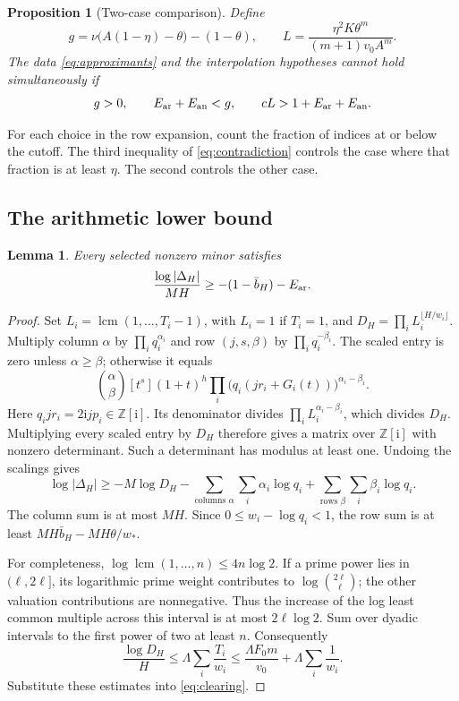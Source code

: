 \documentclass[11pt]{article}
\newtheorem{proposition}[theorem]{Proposition}
\newtheorem{lemma}[theorem]{Lemma}
\theoremstyle{definition}
\theoremstyle{remark}
\newcommand{\Z}{\mathbb Z}
\newcommand{\ii}{\mathrm i}
\newcommand{\lcm}{\operatorname{lcm}}
\numberwithin{equation}{section}
\begin{document}
\begin{proposition}[Two-case comparison]\label{prop:comparison}
Define
\begin{equation}\label{eq:gL}
 g=\nu\bigl(A(1-\eta)-\theta\bigr)-(1-\theta),\qquad
 L=\frac{\eta^2K\theta^m}{(m+1)v_0A^m}.
\end{equation}
The data \eqref{eq:approximants} and the interpolation hypotheses cannot
hold simultaneously if
\begin{equation}\label{eq:contradiction}
 g>0,\qquad E_{\rm ar}+E_{\rm an}<g,\qquad
 cL>1+E_{\rm ar}+E_{\rm an}.
\end{equation}
\end{proposition}

For each choice in the row expansion, count the fraction of indices
at or below the cutoff. The third inequality of \eqref{eq:contradiction}
controls the case where that fraction is at least \(\eta\). The second
controls the other case.

\subsection{The arithmetic lower bound}
\begin{lemma}\label{lem:arithmetic}
Every selected nonzero minor satisfies
\begin{equation}\label{eq:lower}
 \frac{\log|\Delta_H|}{MH}\ge -(1-\bar b_H)-E_{\rm ar}.
\end{equation}
\end{lemma}
\begin{proof}
Set \(L_i=\lcm(1,\ldots,T_i-1)\), with \(L_i=1\) if \(T_i=1\),
and \(D_H=\prod_iL_i^{\lfloor H/w_i\rfloor}\).
Multiply column \(\alpha\) by \(\prod_iq_i^{\alpha_i}\) and row
\((j,s,\beta)\) by \(\prod_iq_i^{-\beta_i}\). The scaled entry is
zero unless \(\alpha\ge\beta\); otherwise it equals
\[
 \binom\alpha\beta[t^s](1+t)^h
       \prod_i\bigl(q_i(jr_i+G_i(t))\bigr)^{\alpha_i-\beta_i}.
\]
Here \(q_ijr_i=2\ii jp_i\in\Z[\ii]\). Its denominator divides
\(\prod_iL_i^{\alpha_i-\beta_i}\), which divides \(D_H\).
Multiplying every scaled entry by \(D_H\) therefore gives a matrix
over \(\Z[\ii]\) with nonzero determinant. Such a determinant has
modulus at least one. Undoing the scalings gives
\begin{equation}\label{eq:clearing}
 \log|\Delta_H|\ge -M\log D_H
 -\sum_{\text{columns }\alpha}\sum_i\alpha_i\log q_i
 +\sum_{\text{rows }\beta}\sum_i\beta_i\log q_i.
\end{equation}
The column sum is at most \(MH\). Since
\(0\le w_i-\log q_i<1\), the row sum is at least
\(MH\bar b_H-MH\theta/w_*\).

For completeness, \(\log\lcm(1,\ldots,n)\le4n\log2\).
If a prime power lies in \((\ell,2\ell]\), its logarithmic prime
weight contributes to \(\log\binom{2\ell}{\ell}\); the other
valuation contributions are nonnegative. Thus the increase of the log
least common multiple across this interval is at most \(2\ell\log2\).
Sum over dyadic intervals to the first power of two at least \(n\).
Consequently
\[
 \frac{\log D_H}{H}\le\Lambda\sum_i\frac{T_i}{w_i}
 \le\frac{\Lambda F_0m}{v_0}+\Lambda\sum_i\frac1{w_i}.
\]
Substitute these estimates into \eqref{eq:clearing}.
\end{proof}
\end{document}
